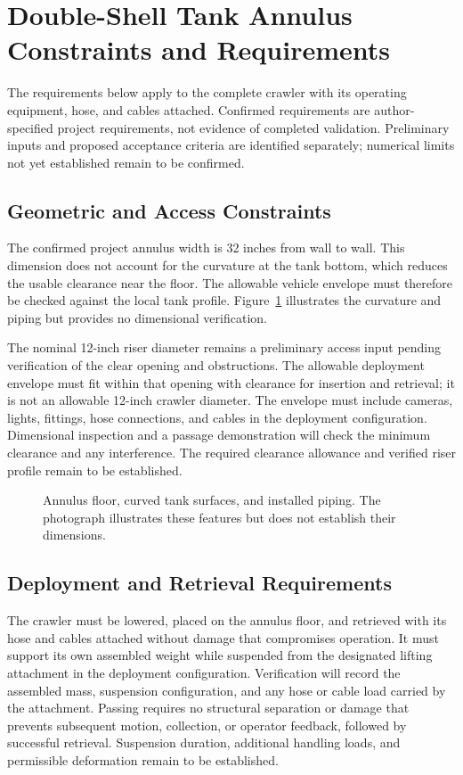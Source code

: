 \section{Double-Shell Tank Annulus Constraints and Requirements}
\label{sec:dst-constraints}
\begingroup
\renewcommand{\thesubsection}{\thesection.\arabic{subsection}}

The requirements below apply to the complete crawler with its operating equipment, hose, and cables attached. Confirmed requirements are author-specified project requirements, not evidence of completed validation. Preliminary inputs and proposed acceptance criteria are identified separately; numerical limits not yet established remain to be confirmed.

\subsection{Geometric and Access Constraints}
\label{sec:annulus-geometry}
The confirmed project annulus width is 32 inches from wall to wall. This dimension does not account for the curvature at the tank bottom, which reduces the usable clearance near the floor. The allowable vehicle envelope must therefore be checked against the local tank profile. Figure~\ref{fig:annulus-clearance} illustrates the curvature and piping but provides no dimensional verification.

The nominal 12-inch riser diameter remains a preliminary access input pending verification of the clear opening and obstructions. The allowable deployment envelope must fit within that opening with clearance for insertion and retrieval; it is not an allowable 12-inch crawler diameter. The envelope must include cameras, lights, fittings, hose connections, and cables in the deployment configuration. Dimensional inspection and a passage demonstration will check the minimum clearance and any interference. The required clearance allowance and verified riser profile remain to be established.

\begin{figure}[H]
\centering
{}
\caption{Annulus floor, curved tank surfaces, and installed piping. The photograph illustrates these features but does not establish their dimensions.}
\label{fig:annulus-clearance}
\end{figure}

\subsection{Deployment and Retrieval Requirements}
\label{sec:deployment-requirements}
The crawler must be lowered, placed on the annulus floor, and retrieved with its hose and cables attached without damage that compromises operation. It must support its own assembled weight while suspended from the designated lifting attachment in the deployment configuration. Verification will record the assembled mass, suspension configuration, and any hose or cable load carried by the attachment. Passing requires no structural separation or damage that prevents subsequent motion, collection, or operator feedback, followed by successful retrieval. Suspension duration, additional handling loads, and permissible deformation remain to be established.


